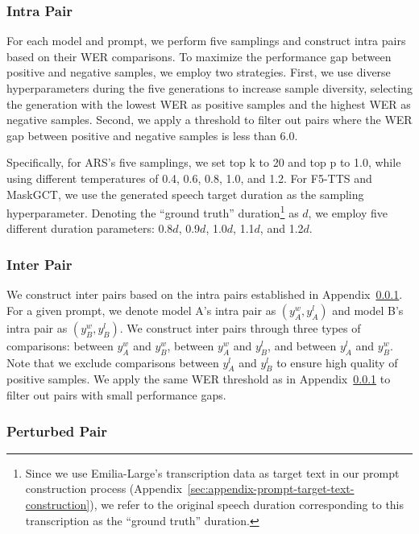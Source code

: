 \documentclass[11pt]{article}
\begin{document}
\subsubsection{Intra Pair}\label{sec:appendix-intp-intra-pair}

For each model and prompt, we perform five samplings and construct intra pairs based on their WER comparisons. To maximize the performance gap between positive and negative samples, we employ two strategies. First, we use diverse hyperparameters during the five generations to increase sample diversity, selecting the generation with the lowest WER as positive samples and the highest WER as negative samples. Second, we apply a threshold to filter out pairs where the WER gap between positive and negative samples is less than 6.0.

Specifically, for ARS's five samplings, we set top k to 20 and top p to 1.0, while using different temperatures of 0.4, 0.6, 0.8, 1.0, and 1.2. For F5-TTS and MaskGCT, we use the generated speech target duration as the sampling hyperparameter. Denoting the ``ground truth'' duration\footnote{Since we use Emilia-Large's transcription data as target text in our prompt construction process (Appendix~\ref{sec:appendix-prompt-target-text-construction}), we refer to the original speech duration corresponding to this transcription as the ``ground truth'' duration.} as $d$, we employ five different duration parameters: 0.8$d$, 0.9$d$, 1.0$d$, 1.1$d$, and 1.2$d$.

\subsubsection{Inter Pair}\label{sec:appendix-intp-inter-pair}

We construct inter pairs based on the intra pairs established in Appendix~\ref{sec:appendix-intp-intra-pair}. For a given prompt, we denote model A's intra pair as $(y^w_A, y^l_A)$ and model B's intra pair as $(y^w_B, y^l_B)$. We construct inter pairs through three types of comparisons: between $y^w_A$ and $y^w_B$, between $y^w_A$ and $y^l_B$, and between $y^l_A$ and $y^w_B$. Note that we exclude comparisons between $y^l_A$ and $y^l_B$ to ensure high quality of positive samples. We apply the same WER threshold as in Appendix~\ref{sec:appendix-intp-intra-pair} to filter out pairs with small performance gaps.

\subsubsection{Perturbed Pair}\label{sec:appendix-intp-perturbed-pair}
\end{document}
